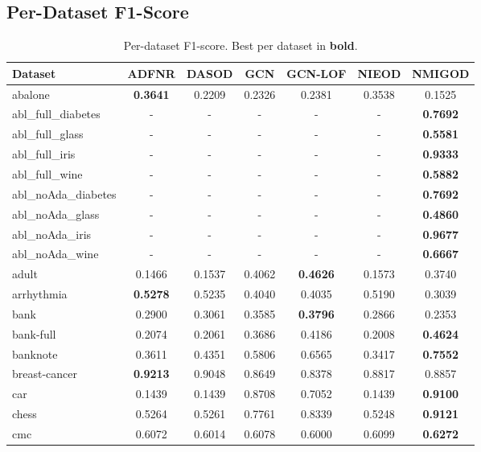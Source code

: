 \documentclass[11pt,a4paper,twocolumn]{article}
\begin{document}
\subsection{Per-Dataset F1-Score}
\begin{table}[t]
\centering
\caption{Per-dataset F1-score. Best per dataset in \textbf{bold}.}
\label{tab:perds}
\scriptsize
\begin{tabular}{lcccccc}
\toprule
Dataset & ADFNR & DASOD & GCN & GCN-LOF & NIEOD & NMIGOD \\
\midrule
        abalone & \textbf{0.3641} & 0.2209 & 0.2326 & 0.2381 & 0.3538 & 0.1525 \\
        abl\_full\_diabetes & - & - & - & - & - & \textbf{0.7692} \\
        abl\_full\_glass & - & - & - & - & - & \textbf{0.5581} \\
        abl\_full\_iris & - & - & - & - & - & \textbf{0.9333} \\
        abl\_full\_wine & - & - & - & - & - & \textbf{0.5882} \\
        abl\_noAda\_diabetes & - & - & - & - & - & \textbf{0.7692} \\
        abl\_noAda\_glass & - & - & - & - & - & \textbf{0.4860} \\
        abl\_noAda\_iris & - & - & - & - & - & \textbf{0.9677} \\
        abl\_noAda\_wine & - & - & - & - & - & \textbf{0.6667} \\
        adult & 0.1466 & 0.1537 & 0.4062 & \textbf{0.4626} & 0.1573 & 0.3740 \\
        arrhythmia & \textbf{0.5278} & 0.5235 & 0.4040 & 0.4035 & 0.5190 & 0.3039 \\
        bank & 0.2900 & 0.3061 & 0.3585 & \textbf{0.3796} & 0.2866 & 0.2353 \\
        bank-full & 0.2074 & 0.2061 & 0.3686 & 0.4186 & 0.2008 & \textbf{0.4624} \\
        banknote & 0.3611 & 0.4351 & 0.5806 & 0.6565 & 0.3417 & \textbf{0.7552} \\
        breast-cancer & \textbf{0.9213} & 0.9048 & 0.8649 & 0.8378 & 0.8817 & 0.8857 \\
        car & 0.1439 & 0.1439 & 0.8708 & 0.7052 & 0.1439 & \textbf{0.9100} \\
        chess & 0.5264 & 0.5261 & 0.7761 & 0.8339 & 0.5248 & \textbf{0.9121} \\
        cmc & 0.6072 & 0.6014 & 0.6078 & 0.6000 & 0.6099 & \textbf{0.6272} \\

\end{tabular}
\end{table}
\end{document}
